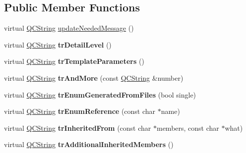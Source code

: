 \subsection*{Public Member Functions}
\begin{DoxyCompactItemize}
\item 
virtual \mbox{\hyperlink{class_q_c_string}{Q\+C\+String}} \mbox{\hyperlink{class_translator_adapter__1__8__0_a47cedb130d9a178d9c632584d4f2abec}{update\+Needed\+Message}} ()
\item 
\mbox{\label{class_translator_adapter__1__8__0_a4da9c471e95968f4c6f67ce92e9d212c}} 
virtual \mbox{\hyperlink{class_q_c_string}{Q\+C\+String}} {\bfseries tr\+Detail\+Level} ()
\item 
\mbox{\label{class_translator_adapter__1__8__0_a2614ce073bd4d9a8b809b76f583e7418}} 
virtual \mbox{\hyperlink{class_q_c_string}{Q\+C\+String}} {\bfseries tr\+Template\+Parameters} ()
\item 
\mbox{\label{class_translator_adapter__1__8__0_a091b619b50fdf129ac17d5aac58bdaa0}} 
virtual \mbox{\hyperlink{class_q_c_string}{Q\+C\+String}} {\bfseries tr\+And\+More} (const \mbox{\hyperlink{class_q_c_string}{Q\+C\+String}} \&number)
\item 
\mbox{\label{class_translator_adapter__1__8__0_af5e54cf6d212a780eaa83dc74cdf1a57}} 
virtual \mbox{\hyperlink{class_q_c_string}{Q\+C\+String}} {\bfseries tr\+Enum\+Generated\+From\+Files} (bool single)
\item 
\mbox{\label{class_translator_adapter__1__8__0_a983c0f41b5a8fd4078045ef28a73ba7e}} 
virtual \mbox{\hyperlink{class_q_c_string}{Q\+C\+String}} {\bfseries tr\+Enum\+Reference} (const char $\ast$name)
\item 
\mbox{\label{class_translator_adapter__1__8__0_a932515e9726f48018b93f49bfd2dba6a}} 
virtual \mbox{\hyperlink{class_q_c_string}{Q\+C\+String}} {\bfseries tr\+Inherited\+From} (const char $\ast$members, const char $\ast$what)
\item 
\mbox{\label{class_translator_adapter__1__8__0_abfa3bd866a75cec56e75751e8ab8d20d}} 
virtual \mbox{\hyperlink{class_q_c_string}{Q\+C\+String}} {\bfseries tr\+Additional\+Inherited\+Members} ()
\end{DoxyCompactItemize}

